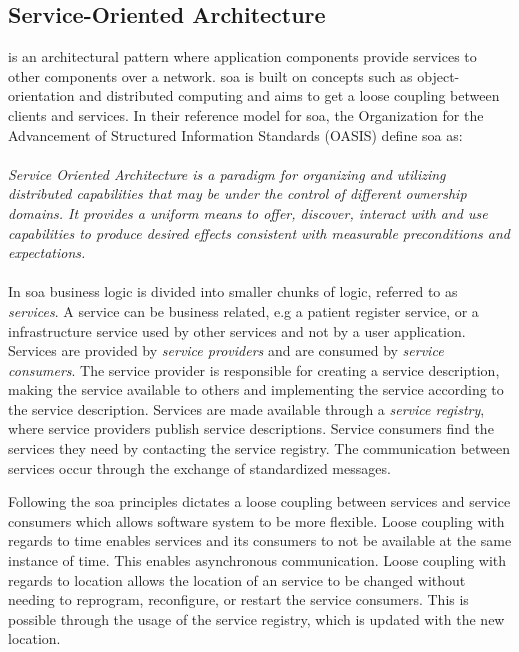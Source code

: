 \documentclass[USenglish]{ifimaster}
\begin{document}
\subsection{Service-Oriented Architecture}
 is an architectural pattern where application components
provide services to other components over a network. \gls{soa} is built on
concepts such as object-orientation and distributed computing and aims to get
a loose coupling between clients and services. In their reference model for
\gls{soa}\cite{oasis-soa-reference-model}, the Organization for the Advancement
of Structured Information Standards (OASIS) define \gls{soa} as: \paragraph{}
\textit{Service Oriented Architecture is a paradigm for organizing and utilizing
distributed capabilities that may be under the control of different ownership
domains. It provides a uniform means to offer, discover, interact with and use
capabilities to produce desired effects consistent with measurable preconditions
and expectations.} %

\paragraph{}
 In \gls{soa} business logic is divided into smaller chunks of logic,
referred to as \textit{services}. A service can be business related, e.g a
patient register service, or a infrastructure service used by other services and
not by a user application.  Services are provided by \textit{service providers}
and are consumed by \textit{service consumers}. The service provider is
responsible for creating a service description, making the service available to
others and implementing the service according to the service description.
Services are made available through a \textit{service registry}, where service
providers publish service descriptions. Service consumers find the services they
need by contacting the service registry. The communication between services
occur through the exchange of standardized messages.

Following the \gls{soa} principles dictates a loose coupling between services
and service consumers which allows software system to be more flexible. Loose
coupling with regards to time enables services and its consumers to not be
available at the same instance of time. This enables asynchronous communication.
Loose coupling with regards to location allows the location of an service to be
changed without needing to reprogram, reconfigure, or restart the service
consumers. This is possible through the usage of the service registry, which is
updated with the new location.
\end{document}
